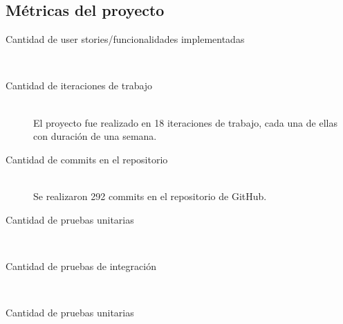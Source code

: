 \subsection{Métricas del proyecto}

\begin{description}
\item[Cantidad de user stories/funcionalidades implementadas] \mbox{} \\


\item[Cantidad de iteraciones de trabajo] \mbox{} \\
El proyecto fue realizado en 18 iteraciones de trabajo, cada una de ellas con duración de una semana.

\item[Cantidad de commits en el repositorio] \mbox{} \\
Se realizaron 292 commits en el repositorio de GitHub.

\item[Cantidad de pruebas unitarias] \mbox{} \\


\item[Cantidad de pruebas de integración] \mbox{} \\


\item[Cantidad de pruebas unitarias] \mbox{} \\


\end{description}